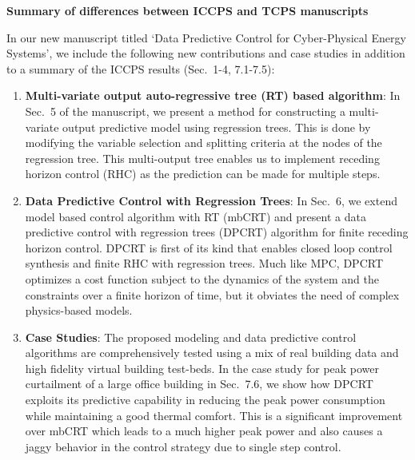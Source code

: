 \documentclass[11pt,stdletter,dateno]{newlfm}
\begin{document}
\begin{newlfm}
\begin{center}
\textbf{Summary of differences between ICCPS and TCPS manuscripts}
\end{center}
\vspace{1cm}

In our new manuscript titled `Data Predictive Control for Cyber-Physical Energy Systems', we include the following new contributions and case studies in addition to a summary of the ICCPS results (Sec.~1-4, 7.1-7.5):
\begin{enumerate}
\item \textbf{Multi-variate output auto-regressive tree (RT) based algorithm}:
In Sec.~5 of the manuscript, we present a method for constructing a multi-variate output predictive model using regression trees. This is done by modifying the variable selection and splitting criteria at the nodes of the regression tree. This multi-output tree enables us to implement receding horizon control (RHC) as the prediction can be made for multiple steps.
\item \textbf{Data Predictive Control with Regression Trees}:
In Sec.~6, we extend model based control algorithm with RT (mbCRT) and present a data predictive control with regression trees (DPCRT) algorithm for finite receding horizon control. DPCRT is first of its kind that enables closed loop control synthesis and finite RHC with regression trees. Much like MPC, DPCRT optimizes a cost function subject to the dynamics of the system and the constraints over a finite horizon of time, but it obviates the need of complex physics-based models.
\item \textbf{Case Studies}:
The proposed modeling and data predictive control algorithms are comprehensively tested using a mix of real building data and high fidelity virtual building test-beds. In the case study for peak power curtailment of a large office building in Sec.~7.6, we show how DPCRT exploits its predictive capability in reducing the peak power consumption while maintaining a good thermal comfort. This is a significant improvement over mbCRT which leads to a much higher peak power and also causes a jaggy behavior in the control strategy due to single step control.
\end{enumerate}

\end{newlfm}
\end{document}
